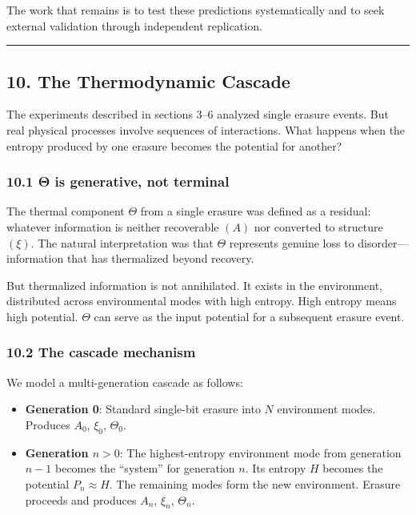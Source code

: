 \documentclass[
  11pt,
  a4paper]{article}
\providecommand{\tightlist}{%
  \setlength{\itemsep}{0pt}\setlength{\parskip}{0pt}}
\begin{document}
The work that remains is to test these predictions systematically and to
seek external validation through independent replication.

\begin{center}\rule{0.5\linewidth}{0.5pt}\end{center}

\subsection{10. The Thermodynamic
Cascade}\label{the-thermodynamic-cascade}

The experiments described in sections 3--6 analyzed single erasure
events. But real physical processes involve sequences of interactions.
What happens when the entropy produced by one erasure becomes the
potential for another?

\subsubsection{10.1 Θ is generative, not
terminal}\label{ux3b8-is-generative-not-terminal}

The thermal component \(\Theta\) from a single erasure was defined as a
residual: whatever information is neither recoverable \((A)\) nor
converted to structure \((\xi)\). The natural interpretation was that
\(\Theta\) represents genuine loss to disorder---information that has
thermalized beyond recovery.

But thermalized information is not annihilated. It exists in the
environment, distributed across environmental modes with high entropy.
High entropy means high potential. \(\Theta\) can serve as the input
potential for a subsequent erasure event.

\subsubsection{10.2 The cascade mechanism}\label{the-cascade-mechanism}

We model a multi-generation cascade as follows:

\begin{itemize}
\tightlist
\item
  \textbf{Generation 0}: Standard single-bit erasure into \(N\)
  environment modes. Produces \(A_0\), \(\xi_0\), \(\Theta_0\).
\item
  \textbf{Generation \(n > 0\)}: The highest-entropy environment mode
  from generation \(n-1\) becomes the ``system'' for generation \(n\).
  Its entropy \(H\) becomes the potential \(P_n \approx H\). The
  remaining modes form the new environment. Erasure proceeds and
  produces \(A_n\), \(\xi_n\), \(\Theta_n\).
\end{itemize}
\end{document}
